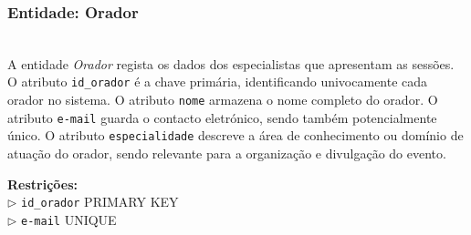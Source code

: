 \documentclass[runningheads]{llncs}
\begin{document}
                    \noindent\begin{minipage}{\textwidth}
                    \subsubsection{Entidade: Orador}\mbox{}\\

                    A entidade \textit{Orador} regista os dados dos especialistas que apresentam as sessões. 
                    O atributo \texttt{id\_orador} é a chave primária, identificando univocamente cada orador 
                    no sistema. O atributo \texttt{nome} armazena o nome completo do orador. O atributo 
                    \texttt{e-mail} guarda o contacto eletrónico, sendo também potencialmente único. 
                    O atributo \texttt{especialidade} descreve a área de conhecimento ou domínio de atuação 
                    do orador, sendo relevante para a organização e divulgação do evento.

                    \begin{table}[H]
                    \centering
                    \renewcommand{\arraystretch}{1.5}
                    \vspace{0.2cm}
                    \caption{Atributos da entidade Orador}
                    \label{tab:orador}
                    \end{table}
                    \vspace{0.1cm}
                    \noindent\textbf{Restrições:}\\
                    \indent $\triangleright$ \texttt{id\_orador} PRIMARY KEY\\
                    \indent $\triangleright$ \texttt{e-mail} UNIQUE
                    \end{minipage}
                    \vspace{0.4cm}
\end{document}

